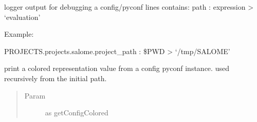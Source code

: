 \documentclass[a4paper,10pt,english]{sphinxmanual}
\begin{document}

\begin{fulllineitems}
\label{\detokenize{apidoc_src/src:src.configManager.print_debug}}
logger output for debugging a config/pyconf
lines contains: path : expression \textendash{}\textgreater{} ‘evaluation’

\begin{DUlineblock}{0em}
\item[] Example:
\item[] PROJECTS.projects.salome.project\_path : \$PWD \textendash{}\textgreater{} ‘/tmp/SALOME’
\end{DUlineblock}

\end{fulllineitems}


\begin{fulllineitems}
\label{\detokenize{apidoc_src/src:src.configManager.print_value}}
print a colored representation value from a config pyconf instance.
used recursively from the initial path.
\begin{quote}\begin{description}
\item[{Param}] \leavevmode
as getConfigColored

\end{description}\end{quote}

\end{fulllineitems}

\end{document}
